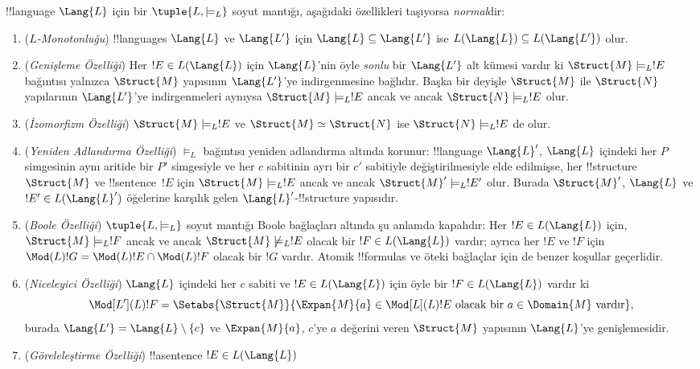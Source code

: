 \documentclass[../../../include/open-logic-section]{subfiles}
\begin{document}
\begin{defn}
!!{language} $\Lang{L}$ için bir $\tuple{L,\models_L}$ soyut mantığı,
aşağıdaki özellikleri taşıyorsa \emph{normal}dir:
\begin{enumerate}
\item (\emph{$L$-Monotonluğu}) !!{language}s $\Lang{L}$ ve $\Lang{L'}$
  için $\Lang{L} \subseteq \Lang{L'}$ ise
  $L(\Lang{L}) \subseteq L(\Lang{L'})$ olur.
\item (\emph{Genişleme Özelliği}) Her $!E \in L(\Lang{L})$ için
  $\Lang{L}$'nin öyle \emph{sonlu} bir $\Lang{L'}$ alt kümesi vardır ki
  $\Struct{M} \models_L !E$ bağıntısı yalnızca $\Struct{M}$ yapısının
  $\Lang{L'}$'ye indirgenmesine bağlıdır. Başka bir deyişle $\Struct{M}$
  ile $\Struct{N}$ yapılarının $\Lang{L'}$'ye indirgenmeleri aynıysa
  $\Struct{M} \models_L !E$ ancak ve ancak $\Struct{N} \models_L !E$ olur.
\item (\emph{İzomorfizm Özelliği}) $\Struct{M} \models_L !E$ ve
  $\Struct{M} \simeq \Struct{N}$ ise $\Struct{N} \models_L !E$ de olur.
\item (\emph{Yeniden Adlandırma Özelliği}) $\models_L$ bağıntısı yeniden
  adlandırma altında korunur: !!{language} $\Lang{L}'$, $\Lang{L}$ içindeki
  her $P$ simgesinin aynı aritide bir $P'$ simgesiyle ve her $c$ sabitinin
  ayrı bir $c'$ sabitiyle değiştirilmesiyle elde edilmişse, her
  !!{structure}~$\Struct{M}$ ve !!{sentence}~$!E$ için
  $\Struct{M} \models_L !E$ ancak ve ancak
  $\Struct{M}' \models_L !E'$ olur. Burada $\Struct{M}'$, $\Lang{L}$ ve
  $!E' \in L(\Lang{L}')$ öğelerine karşılık gelen $\Lang{L}'$-!!{structure}
  yapısıdır.
\item (\emph{Boole Özelliği}) $\tuple{L,\models_L}$ soyut mantığı Boole
  bağlaçları altında şu anlamda kapalıdır: Her $!E \in L(\Lang{L})$ için,
  $\Struct{M} \models_L !F$ ancak ve ancak
  $\Struct{M} \not\models_L !E$ olacak bir $!F \in L(\Lang{L})$ vardır;
  ayrıca her $!E$ ve $!F$ için
  $\Mod(L){!G}=\Mod(L){!E}\cap\Mod(L){!F}$ olacak bir $!G$ vardır.
  Atomik !!{formula}s ve öteki bağlaçlar için de benzer koşullar geçerlidir.
\item (\emph{Niceleyici Özelliği}) $\Lang{L}$ içindeki her $c$ sabiti ve
  $!E \in L(\Lang{L})$ için öyle bir $!F \in L(\Lang{L})$ vardır ki
  \[
  \Mod[L'](L){!F} = \Setabs{\Struct{M}}{\Expan{M}{a} \in
  \Mod[L](L){!E} \text{ olacak bir } a \in \Domain{M} \text{ vardır}},
  \]
  burada $\Lang{L'}=\Lang{L}\setminus\{c\}$ ve $\Expan{M}{a}$,
  $c$'ye $a$ değerini veren $\Struct{M}$ yapısının $\Lang{L}$'ye
  genişlemesidir.
\item (\emph{Göreleleştirme Özelliği}) !!a{sentence} $!E\in L(\Lang{L})$

\end{enumerate}
\end{defn}
\end{document}
